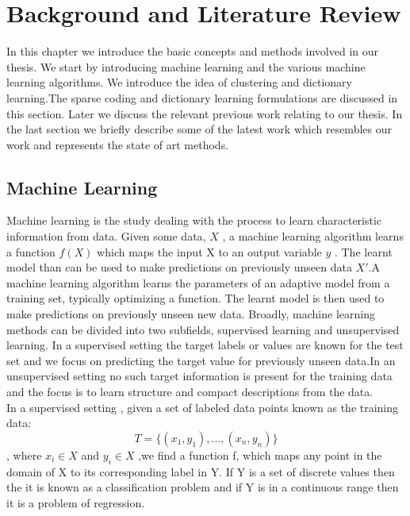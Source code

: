 
\chapter{Background and Literature Review}

\ifpdf
\graphicspath{{Chapter2/Figs/Raster/}{Chapter2/Figs/PDF/}{Chapter2/Figs/}}
\else
\graphicspath{{Chapter2/Figs/Vector/}{Chapter2/Figs/}}
\fi

In this chapter we introduce the basic concepts and methods involved in our thesis. We start by introducing machine learning and the various machine learning algorithms. We introduce the idea of clustering and dictionary learning.The sparse coding and dictionary learning formulations are discussed in this section. Later we discuss the relevant previous work relating to our thesis. In the last section we briefly describe some of the latest work which resembles our work and represents the state of art methods.
\section[Machine Learning]{Machine Learning}

Machine learning is the study dealing with the process to learn characteristic information from data. Given some data, $ X $ , a machine learning algorithm learns a function $ f(X) $ which maps the input X to an output variable $y$ . The learnt model than can be used to make predictions on previously unseen data $X'$.A machine learning algorithm learns the parameters of an adaptive model from a training set, typically optimizing a function. The learnt model is then used to make predictions on previously unseen new data. Broadly, machine learning methods can be divided into two subfields, supervised learning and unsupervised learning. In a supervised setting the target labels or values are known for the test set and we focus on predicting the target value for previously unseen data.In an unsupervised setting no such target information is present for the training data and the focus is to learn structure and compact descriptions from the data.\\

In a supervised setting , given a set of labeled  data points known as the training data: $$ T = \{(x_1,y_1),...,(x_n,y_n)\} $$, where $x_i \in X$ and $y_i \in X$ ,we find a function f, which maps any point in the domain of X to its corresponding label in Y.
If Y is a set of discrete values then the it is known as a classification problem and if Y is in a continuous range then it is a problem of regression.\\

